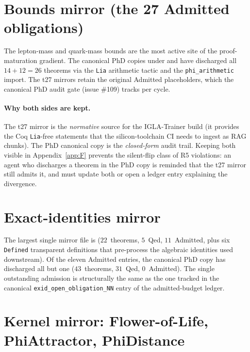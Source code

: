\section{Bounds mirror (the 27 Admitted obligations)}
\label{sec:ext:bounds}

The lepton-mass and quark-mass bounds are the most active site of the
proof-maturation gradient. The canonical PhD copies under
 and
 have discharged all $14 + 12 = 26$
theorems via the \texttt{Lia} arithmetic tactic and the
\texttt{phi\_arithmetic} import. The t27 mirrors retain the original
Admitted placeholders, which the canonical PhD audit gate (issue
\#109) tracks per cycle.

\paragraph{Why both sides are kept.} The t27 mirror is the
\emph{normative} source for the IGLA-Trainer build (it provides the
Coq \texttt{Lia}-free statements that the silicon-toolchain CI needs to
ingest as RAG chunks). The PhD canonical copy is the \emph{closed-form}
audit trail. Keeping both visible in Appendix~\ref{app:F} prevents the
silent-flip class of R5 violations: an agent who discharges a theorem
in the PhD copy is reminded that the t27 mirror still admits it, and
must update both or open a ledger entry explaining the divergence.

\section{Exact-identities mirror}
\label{sec:ext:exid}

The largest single mirror file is
 ($22$~theorems,
$5$~Qed, $11$~Admitted, plus six \texttt{Defined} transparent
definitions that pre-process the algebraic identities used downstream).
Of the eleven Admitted entries, the canonical PhD copy
 has discharged
all but one ($43$~theorems, $31$~Qed, $0$~Admitted). The single
outstanding admission is structurally the same as the one tracked in
the canonical \texttt{exid\_open\_obligation\_NN} entry of the
admitted-budget ledger.

\section{Kernel mirror: Flower-of-Life, PhiAttractor, PhiDistance}
\label{sec:ext:kernel}

